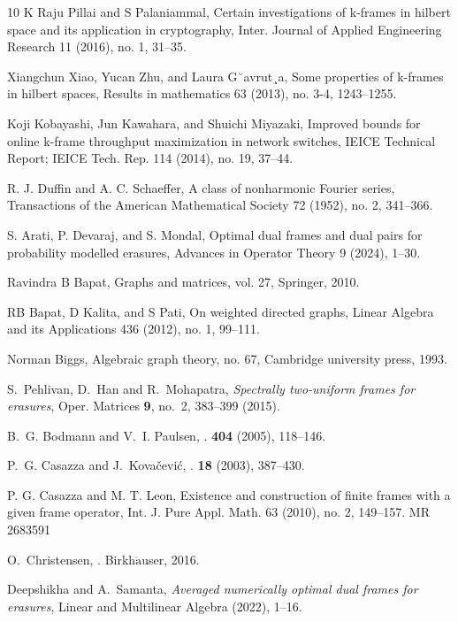 \documentclass[final,1p,times]{elsarticle}
\begin{document}
\begin{thebibliography}{10}
K Raju Pillai and S Palaniammal, Certain investigations of k-frames in hilbert space and its application in
cryptography, Inter. Journal of Applied Engineering Research 11 (2016), no. 1, 31–35.

 Xiangchun Xiao, Yucan Zhu, and Laura G˘avrut¸a, Some properties of k-frames in hilbert spaces, Results in
mathematics 63 (2013), no. 3-4, 1243–1255.


Koji Kobayashi, Jun Kawahara, and Shuichi Miyazaki, Improved bounds for online k-frame throughput
maximization in network switches, IEICE Technical Report; IEICE Tech. Rep. 114 (2014), no. 19, 37–44.


R. J. Duffin and A. C. Schaeffer, A class of nonharmonic Fourier series, Transactions of the American Mathematical
Society 72 (1952), no. 2, 341–366.

S. Arati, P. Devaraj, and S. Mondal, Optimal dual frames and dual pairs for probability modelled erasures,
Advances in Operator Theory 9 (2024), 1–30.

Ravindra B Bapat, Graphs and matrices, vol. 27, Springer, 2010.

RB Bapat, D Kalita, and S Pati, On weighted directed graphs, Linear Algebra and its Applications 436 (2012), no. 1, 99–111.


Norman Biggs, Algebraic graph theory, no. 67, Cambridge university press, 1993.

S.~Pehlivan, D.~Han and R.~Mohapatra, \emph{Spectrally two-uniform
  frames for erasures}, Oper. Matrices \textbf{9}, no.~2, 383--399 (2015).


B.~G. Bodmann and V.~I. Paulsen,
.
 \textbf{404} (2005), 118--146.

P.~G. Casazza and J.~Kova{\v{c}}evi{\'c},
.
 \textbf{18} (2003), 387--430.


P. G. Casazza and M. T. Leon, Existence and construction of finite frames with a given frame operator, Int. J. Pure Appl. Math. 63 (2010), no. 2, 149–157. MR 2683591


O.~Christensen,
.
\newblock Birkh$\ddot{\text{a}}$user, 2016.

Deepshikha and A.~Samanta, \emph{Averaged numerically optimal dual frames for
  erasures}, Linear and Multilinear Algebra (2022), 1--16.



\end{thebibliography}
\end{document}
